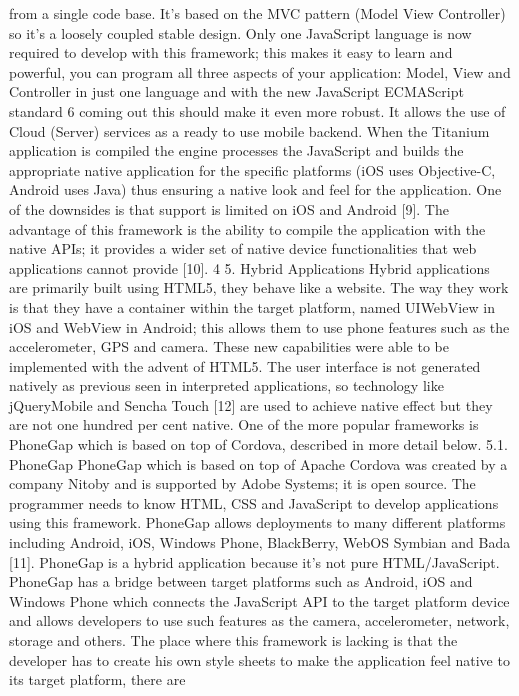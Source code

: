from a single code base. It’s based on the MVC pattern (Model View
Controller) so it’s a loosely coupled stable design. Only one JavaScript
language is now required to develop with this framework; this makes it easy
to learn and powerful, you can program all three aspects of your application:
Model, View and Controller in just one language and with the new JavaScript
ECMAScript standard 6 coming out this should make it even more robust. It
allows the use of Cloud (Server) services as a ready to use mobile backend.
When the Titanium application is compiled the engine processes the
JavaScript and builds the appropriate native application for the specific
platforms (iOS uses Objective-C, Android uses Java) thus ensuring a native
look and feel for the application. One of the downsides is that support is
limited on iOS and Android [9]. The advantage of this framework is the ability
to compile the application with the native APIs; it provides a wider set of
native device functionalities that web applications cannot provide [10].
4
5. Hybrid Applications
Hybrid applications are primarily built using HTML5, they behave like a
website. The way they work is that they have a container within the target
platform, named UIWebView in iOS and WebView in Android; this allows
them to use phone features such as the accelerometer, GPS and camera.
These new capabilities were able to be implemented with the advent of
HTML5. The user interface is not generated natively as previous seen in
interpreted applications, so technology like jQueryMobile and Sencha Touch
[12] are used to achieve native effect but they are not one hundred per cent
native. One of the more popular frameworks is PhoneGap which is based on
top of Cordova, described in more detail below.
5.1. PhoneGap
PhoneGap which is based on top of Apache Cordova was created by a
company Nitoby and is supported by Adobe Systems; it is open source. The
programmer needs to know HTML, CSS and JavaScript to develop
applications using this framework. PhoneGap allows deployments to many
different platforms including Android, iOS, Windows Phone, BlackBerry,
WebOS Symbian and Bada [11]. PhoneGap is a hybrid application because it’s
not pure HTML/JavaScript. PhoneGap has a bridge between target platforms
such as Android, iOS and Windows Phone which connects the JavaScript API
to the target platform device and allows developers to use such features as
the camera, accelerometer, network, storage and others. The place where
this framework is lacking is that the developer has to create his own style
sheets to make the application feel native to its target platform, there are
